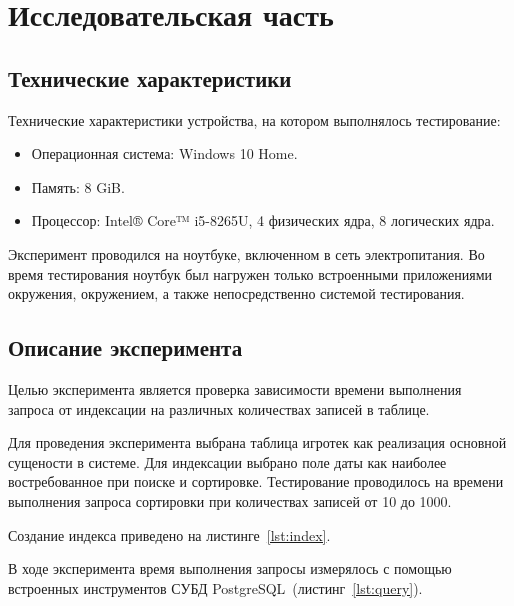 \chapter{\label{research}Исследовательская часть}

\section{Технические характеристики}

Технические характеристики устройства, на котором выполнялось тестирование:

\begin{itemize}
	\item Операционная система: Windows 10 Home.
	\item Память: 8 GiB.
    \item Процессор: Intel® Core™ i5-8265U, 4 физических ядра, 8 логических
        ядра.
\end{itemize}

Эксперимент проводился на ноутбуке, включенном в сеть электропитания. Во
время тестирования ноутбук был нагружен только встроенными приложениями
окружения, окружением, а также непосредственно системой тестирования.

\section{Описание эксперимента}

Целью эксперимента является проверка зависимости времени выполнения запроса от
индексации на различных количествах записей в таблице.

Для проведения эксперимента выбрана таблица игротек как реализация основной
сущености в системе. Для индексации выбрано поле даты как наиболее
востребованное при поиске и сортировке. Тестирование проводилось на времени
выполнения запроса сортировки при количествах записей от 10 до 1000.

Создание индекса приведено на листинге~\ref{lst:index}.

{
\captionsetup{format=hang,justification=raggedright,
              singlelinecheck=off,width=16cm}
}

В ходе эксперимента время выполнения запросы измерялось с помощью встроенных
инструментов СУБД PostgreSQL~(листинг~\ref{lst:query}).

{
\captionsetup{format=hang,justification=raggedright,
              singlelinecheck=off,width=16cm}
}

